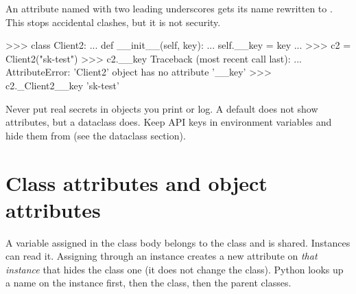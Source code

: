 An attribute named with two leading underscores gets its name rewritten to
. This stops accidental clashes, but it is not security.

\begin{pycode}
>>> class Client2:
...     def __init__(self, key):
...         self.__key = key
...
>>> c2 = Client2("sk-test")
>>> c2.__key
Traceback (most recent call last):
  ...
AttributeError: 'Client2' object has no attribute '__key'
>>> c2._Client2__key
'sk-test'
\end{pycode}

\begin{gamerule}
Never put real secrets in objects you print or log. A default  does not show
attributes, but a dataclass  does. Keep API keys in environment variables and
hide them from  (see the dataclass section).
\end{gamerule}

\section{Class attributes and object attributes}

A variable assigned in the class body belongs to the class and is shared. Instances can read it.
Assigning through an instance creates a new attribute on \emph{that instance} that hides the
class one (it does not change the class). Python looks up a name on the instance first, then the
class, then the parent classes.

\begin{center}
\end{center}

